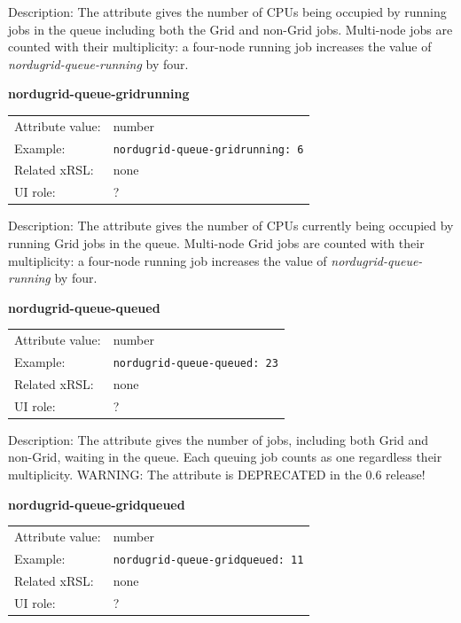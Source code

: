 \documentclass{article}
\begin{document}
Description: The attribute gives the number of 
CPUs being occupied by running jobs in the queue
including both the Grid and  non-Grid jobs.  Multi-node jobs are counted 
with their multiplicity: a four-node running job increases the value of 
{\it nordugrid-queue-running} by four.

  \hspace*{0.5cm}
  \begin{shaded}
    \textbf{nordugrid-queue-gridrunning}
  \end{shaded}
  \begin{tabular}{lp{10cm}}  
    Attribute value:& number\\
    Example:& \verb#nordugrid-queue-gridrunning: 6#\\
    Related xRSL:& none\\
    UI role:& ?\\
  \end{tabular}

Description: The attribute gives the number of CPUs currently 
being occupied by running Grid jobs in the queue.
Multi-node Grid jobs are counted with their multiplicity: 
a four-node running job increases the value of {\it nordugrid-queue-running}
by four.


  \hspace*{0.5cm}
  \begin{shaded}
    \textbf{nordugrid-queue-queued}
  \end{shaded}
  \begin{tabular}{lp{10cm}}  
    Attribute value:& number\\
    Example:& \verb#nordugrid-queue-queued: 23#\\
    Related xRSL:& none\\
    UI role:& ?\\
  \end{tabular}

Description: The attribute gives the number of jobs, including both Grid and non-Grid, 
waiting in the queue. Each queuing job counts as one regardless their multiplicity. 
WARNING: The attribute is DEPRECATED in the 0.6 release!

  \hspace*{0.5cm}
  \begin{shaded}
    \textbf{nordugrid-queue-gridqueued}
  \end{shaded}
  \begin{tabular}{lp{10cm}}  
    Attribute value:& number\\
    Example:& \verb#nordugrid-queue-gridqueued: 11#\\
    Related xRSL:& none\\
    UI role:& ?\\
  \end{tabular}
\end{document}
